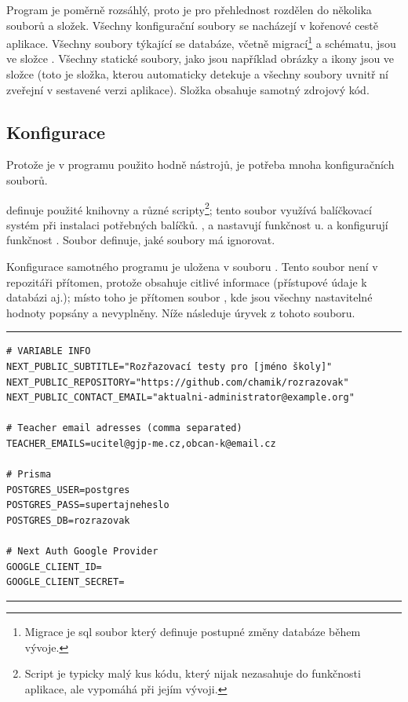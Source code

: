 Program je poměrně rozsáhlý, proto je pro přehlednost rozdělen do několika souborů a složek. Všechny konfigurační soubory se nacházejí v kořenové cestě aplikace. Všechny soubory týkající se databáze, včetně migrací\footnote{Migrace je sql soubor který definuje postupné změny databáze během vývoje.} a schématu, jsou ve složce . Všechny statické soubory, jako jsou například obrázky a ikony jsou ve složce  (toto je složka, kterou  automaticky detekuje a všechny soubory uvnitř ní zveřejní v sestavené verzi aplikace). Složka  obsahuje samotný zdrojový kód.

\subsection{Konfigurace}
\label{sec:config}

Protože je v programu použito hodně nástrojů, je potřeba mnoha konfiguračních souborů.

 definuje použité knihovny a různé scripty\footnote{Script je typicky malý kus kódu, který nijak nezasahuje do funkčnosti aplikace, ale vypomáhá při jejím vývoji.}; tento soubor využívá balíčkovací systém  při instalaci potřebných balíčků. ,  a  nastavují funkčnost u.  a  konfigurují funkčnost . Soubor  definuje, jaké soubory má  ignorovat.

Konfigurace samotného programu je uložena v souboru . Tento soubor není v repozitáři přítomen, protože obsahuje citlivé informace (přístupové údaje k databázi aj.); místo toho je přítomen soubor , kde jsou všechny nastavitelné hodnoty popsány a nevyplněny. Níže následuje úryvek z tohoto souboru.

\indent

\hrule
\begin{verbatim}
# VARIABLE INFO
NEXT_PUBLIC_SUBTITLE="Rozřazovací testy pro [jméno školy]"
NEXT_PUBLIC_REPOSITORY="https://github.com/chamik/rozrazovak"
NEXT_PUBLIC_CONTACT_EMAIL="aktualni-administrator@example.org"

# Teacher email adresses (comma separated)
TEACHER_EMAILS=ucitel@gjp-me.cz,obcan-k@email.cz

# Prisma
POSTGRES_USER=postgres
POSTGRES_PASS=supertajneheslo
POSTGRES_DB=rozrazovak

# Next Auth Google Provider
GOOGLE_CLIENT_ID=
GOOGLE_CLIENT_SECRET=
\end{verbatim}
\hrule

